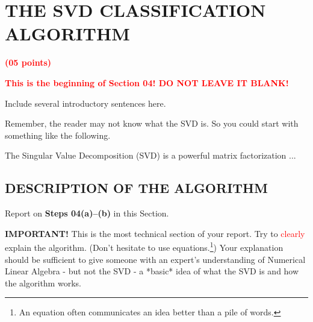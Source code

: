 \documentclass[dvipsnames,12pt]{article} %
\newcommand{\Nb}[1]{{\textcolor{NavyBlue}{#1}}}
\newcommand{\rd}[1]{{\textcolor{red}{#1}}}
\newcommand{\BNb}[1]{\textbf{\Nb{#1}}} %
\newcommand{\Brd}[1]{{\textbf{\textcolor{Red}{#1}}}}               %
\begin{document}
      \section{THE SVD CLASSIFICATION ALGORITHM}
        \label{SECT 04:SVD CLASSIFICATION ALGORITHM}
    
        \Brd{(05 points)}

        \vspace{06pt}

        \Brd{This is the beginning of Section 04! DO NOT LEAVE IT BLANK!}
        
        \vspace{06pt}

        Include several introductory sentences here.

        \vspace{06pt}

        Remember, the reader may not know what the SVD is.
        So you could start with something like the following.

        \vspace{06pt}

        The Singular Value Decomposition (SVD) is a powerful matrix factorization ...

        \subsection{DESCRIPTION OF THE ALGORITHM}
          \label{SECT 04.01:SVD DESCRIPTION}

          Report on \textbf{Steps 04(a)--(b)} in this Section.

          \vspace{06pt}

          \BNb{IMPORTANT!} This is the most technical section of your report.
          Try to \rd{{{clearly}}} explain the algorithm.
          (Don't hesitate to use equations.\footnote{An equation often communicates an idea better than a pile of words.})
          Your explanation should be sufficient to give someone with an expert's understanding of
          Numerical Linear Algebra - but not the SVD - a *basic* idea of what the SVD is and how
          the algorithm works.

\end{document}
